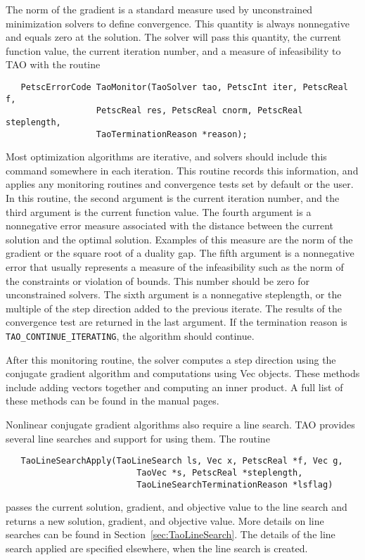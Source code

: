 The norm of the gradient is a standard measure used
by unconstrained minimization solvers to define convergence.
This quantity is always nonnegative and equals zero at the solution.  
The solver will pass this quantity, the current
function value, the current iteration number, and a measure of
infeasibility to TAO with the routine
\begin{verbatim}
   PetscErrorCode TaoMonitor(TaoSolver tao, PetscInt iter, PetscReal f,
                  PetscReal res, PetscReal cnorm, PetscReal steplength,
                  TaoTerminationReason *reason);
\end{verbatim}
Most optimization algorithms are iterative, and solvers should
include this command somewhere in each iteration.  This routine
records this information, and applies any monitoring routines and 
convergence tests set by default or the user.
In this routine, the second argument is the current
iteration number, and the third argument is the current function value.
The fourth argument is a nonnegative error measure associated with the
distance between the current solution and the optimal solution.  Examples
of this measure are the norm of the gradient or the square root of a duality 
gap. The fifth argument is a nonnegative error 
that usually
represents a measure of the infeasibility
such as the norm of the constraints or violation of bounds.
This number should be zero for unconstrained solvers.
The sixth argument is a nonnegative steplength, 
or the multiple of the step direction added to the previous iterate.
The results of the convergence test are returned in the last argument.
If the termination reason is {\tt TAO\_CONTINUE\_ITERATING}, the
algorithm should continue.

After this monitoring routine, the solver computes a step direction
using the conjugate gradient algorithm and computations using Vec objects.  
These methods include
adding vectors together and computing an inner product.  A full list
of these methods can be found in the manual pages.

Nonlinear conjugate gradient algorithms also require a line search.  TAO
provides several line searches and support for using them.
The routine
\begin{verbatim}
   TaoLineSearchApply(TaoLineSearch ls, Vec x, PetscReal *f, Vec g, 
                          TaoVec *s, PetscReal *steplength, 
                          TaoLineSearchTerminationReason *lsflag)
\end{verbatim}
passes the current solution, gradient, and objective value to the
line search and returns a new solution, gradient, and objective value.  More
details on line searches can be found in Section~\ref{sec:TaoLineSearch}.
The details of the line search applied are specified elsewhere, when
the line search is created.

